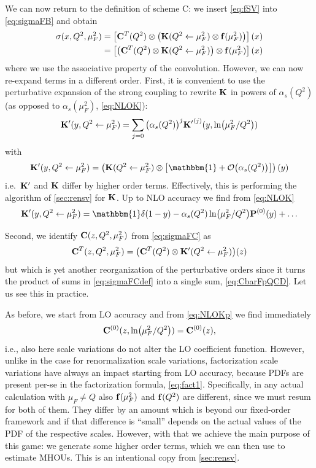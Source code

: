 We can now return to the definition of scheme C: we insert \cref{eq:fSV} into \cref{eq:sigmaFB} and obtain
\begin{align}
    \sigma(x,Q^2,\mu_F^2) &= \qty[\vb C^T(Q^2) \otimes \qty(\vb K(Q^2 \leftarrow \mu_F^2) \otimes \vb f(\mu_F^2))](x)\\
     &= \qty[\qty(\vb C^T(Q^2) \otimes \vb K(Q^2 \leftarrow \mu_F^2)) \otimes \vb f(\mu_F^2)](x) \label{eq:sigmaFCdef}
\end{align}
where we use the associative property of the convolution.
However, we can now re-expand terms in a different order.
First, it is convenient to use the perturbative expansion of the strong coupling to rewrite $\vb K$ in powers of $\alpha_s(Q^2)$ (as opposed to $\alpha_s(\mu_F^2)$, \cref{eq:NLOK}):
\begin{equation}
    \vb K'(y,Q^2 \leftarrow \mu_F^2) = \sum_{j=0} \qty(\alpha_s(Q^2))^j \vb {K'}^{(j)}(y,\ln(\mu_F^2/Q^2))
\end{equation}
with
\begin{equation}
    \vb K'(y,Q^2 \leftarrow \mu_F^2) = \left(\vb K(Q^2 \leftarrow \mu_F^2)\otimes\left[\mathbbm{1} + \order{\alpha_s(Q^2)}\right]\right)(y)
\end{equation}
i.e.\ $\vb K'$ and $\vb K$ differ by higher order terms.
Effectively, this is performing the algorithm of \cref{sec:rensv} for $\vb K$.
Up to NLO accuracy we find from \cref{eq:NLOK}
\begin{equation}
    \vb K'(y,Q^2 \leftarrow \mu_F^2) = \mathbbm{1}\delta(1-y) - \alpha_s(Q^2) \ln(\mu_F^2/Q^2) \vb P^{(0)}(y) + \ldots \label{eq:NLOKp}
\end{equation}

Second, we identify $\vb C(z,Q^2,\mu_F^2)$ from \cref{eq:sigmaFC} as
\begin{equation}
    \vb C^T(z,Q^2,\mu_F^2) = \qty(\vb C^T(Q^2) \otimes \vb K'(Q^2 \leftarrow \mu_F^2))(z)
\end{equation}
but which is yet another reorganization of the perturbative orders since it turns the product of sums in \cref{eq:sigmaFCdef} into a single sum, \cref{eq:CbarFpQCD}.
Let us see this in practice.

As before, we start from LO accuracy and from \cref{eq:NLOKp} we find immediately
\begin{equation}
    \vb C^{(0)}(z,\ln(\mu_F^2/Q^2)) = \vb C^{(0)}(z), \label{eq:CbarFLO}
\end{equation}
i.e., also here scale variations do not alter the LO coefficient function.
However, unlike in the case for renormalization scale variations, factorization scale variations have always an impact starting from LO accuracy, because PDFs are present per-se in the factorization formula, \cref{eq:fact1}.
Specifically, in any actual calculation with $\mu_F\neq Q$ also $\vb f(\mu_F^2)$ and $\vb f(Q^2)$ are different, since we must resum for both of them.
They differ by an amount which is beyond our fixed-order framework and if that difference is \enquote{small} depends on the actual values of the PDF of the respective scales.
However, with that we achieve the main purpose of this game: we generate some higher order terms, which we can then use to estimate MHOUs.
This is an intentional copy from \cref{sec:rensv}.

